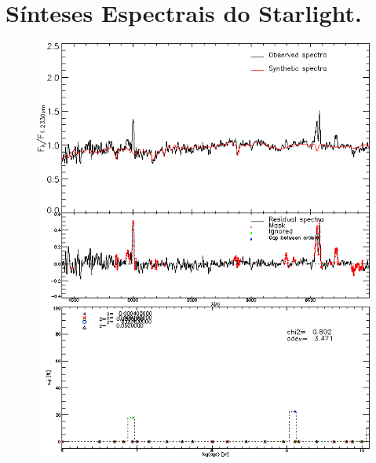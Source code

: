 \chapter{Sínteses Espectrais do Starlight.}
\begin{figure}[ht!]
    \begin{center}
        \includegraphics[scale = 0.35]{figuras/sp1.jpg}

\end{center}
\end{figure}
